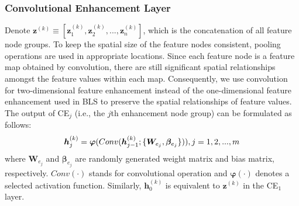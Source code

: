 \documentclass[lettersize,journal]{IEEEtran}
\begin{document}
\subsubsection{Convolutional Enhancement Layer}
Denote $\bm{z}^{(k)}\equiv [\bm{z}_1^{(k)},\bm{z}_2^{(k)},...,\bm{z}_n^{(k)}]$, which is the concatenation of all feature node groups. To keep the spatial size of the feature nodes consistent, pooling operations are used in appropriate locations. Since each feature node is a feature map obtained by convolution, there are still significant spatial relationships amongst the feature values within each map. Consequently, we use convolution for two-dimensional feature enhancement instead of the one-dimensional feature enhancement used in BLS to preserve the spatial relationships of feature values. The output of CE$_j$ (i.e., the $j$th enhancement node group) can be formulated as follows:
\begin{equation}
\label{ConvBLS:h_j^{(k)}}
    \bm{h}_{j}^{(k)} = \bm{\varphi} (Conv(\bm{h}_{j-1}^{(k)}; \{ \bm{W}_{e_j}, \bm{\beta}_{e_j} \})), j=1,2,...,m
\end{equation}
where $\bm{W}_{e_j}$ and $\bm{\beta}_{e_j}$ are randomly generated weight matrix and bias matrix, respectively. $Conv(\cdot)$ stands for convolutional operation and $\bm{\varphi}(\cdot)$ denotes a selected activation function. Similarly, $\bm{h}_0^{(k)}$ is equivalent to $\bm{z}^{(k)}$ in the CE$_1$ layer.
\end{document}
